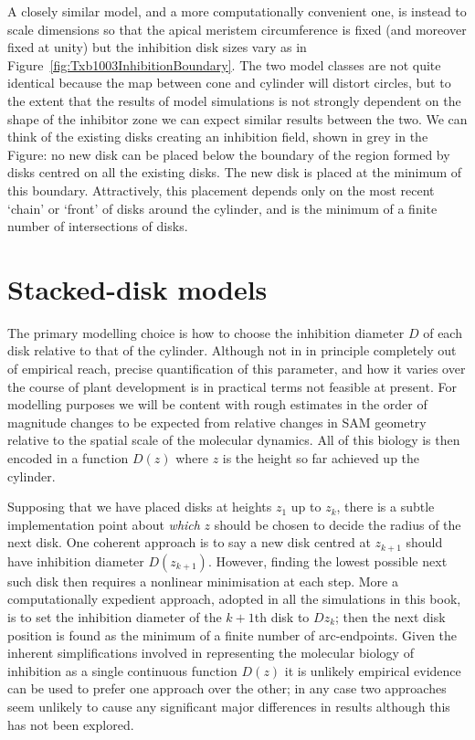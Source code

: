 A closely similar model, and a more computationally convenient one, is instead to scale dimensions so that the apical meristem circumference is fixed (and moreover fixed at unity) but the inhibition disk sizes vary as in Figure~\ref{fig:Txb1003InhibitionBoundary}. The two model classes are not quite identical because the map between cone and cylinder will distort circles, but to the extent that the results of model simulations is not strongly dependent on the shape of the inhibitor zone we can expect similar results between the two.
 We can 
think of the existing disks creating an inhibition field, shown in grey in the Figure: no new disk can be placed below the boundary of the region formed by disks centred on all the existing disks. The new disk is placed at the minimum of this boundary.  Attractively, this placement depends only on the most recent `chain' or `front' of disks around the cylinder, and is the minimum of a finite number of intersections of disks. 


\section{Stacked-disk models}
The primary modelling choice is how to choose the inhibition diameter $D$ of each disk relative to that of the cylinder.
Although not in in principle completely out of empirical reach, precise quantification of this parameter, and how it varies over the course of plant development is in practical terms not feasible at present. For modelling purposes we will be content with rough estimates in the order of magnitude changes to be expected from  relative changes in SAM geometry relative to the spatial scale of the molecular dynamics. All of this biology is then encoded in a function $D(z)$ where $z$ is the height so far achieved up the cylinder.

Supposing that we have placed disks at heights $z_1$ up to $z_k$, there is a subtle implementation point about \textit{which} $z$ should be chosen to decide the radius of the next disk. One coherent approach is to say a new disk centred at $z_{k+1}$ should have inhibition diameter $D(z_{k+1})$. However, finding the lowest possible next such disk then requires a nonlinear minimisation at each step. More a computationally expedient approach, adopted in all the simulations in this book, is to set the inhibition diameter of the $k+1$th disk to $D{z_k}$; then the next disk position is found as the minimum of a finite number of arc-endpoints. Given the inherent simplifications involved in representing the molecular biology of inhibition as a single continuous function $D(z)$ it is unlikely empirical evidence can be used to prefer one approach over the other; in any case two approaches seem unlikely to cause any significant major differences in results although this has not been explored. 

